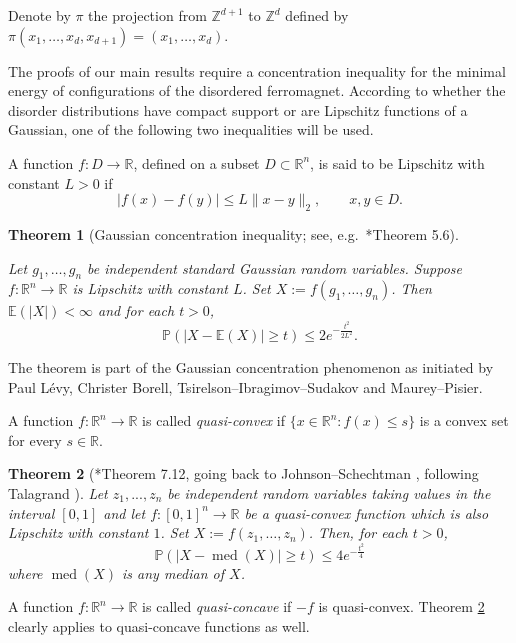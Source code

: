 \documentclass[11pt, reqno]{amsart}
\newtheorem{theorem}{Theorem}[section]
\newcommand{\Z}{\mathbb{Z}}
\newcommand{\R}{\mathbb{R}}
\newcommand{\E}{\mathbb{E}}
\renewcommand{\P}{\mathbb{P}}
\DeclareMathOperator{\med}{med}
\numberwithin{equation}{section}
\begin{document}
Denote by $\pi$ the projection from $\Z^{d+1}$  to $\Z^{d}$ defined by $\pi(x_{1},\dots,x_{d},x_{d+1})=(x_1,\dots,x_d)$.

\medskip
The proofs of our main results require a concentration inequality for the minimal energy of configurations of the disordered ferromagnet. According to whether the disorder distributions have compact support or are Lipschitz functions of a Gaussian, one of the following two inequalities will be used.

A function $f:D\to\R$, defined on a subset $D\subset\R^n$, is said to be Lipschitz with constant $L>0$ if
\begin{equation}\label{eq:Lipschitz function def}
|f(x)-f(y)|\le L\|x-y\|_2,\qquad x,y\in D.
\end{equation}
\begin{theorem}
[Gaussian concentration inequality; see, e.g.~\cite{BLM13}*{Theorem 5.6}]\label{thm:Maurey-Pisier}
\mbox{}

\noindent 
Let $g_1,\ldots, g_n$ be independent standard Gaussian random variables. Suppose $f\colon \R^n\to\R$ is Lipschitz with constant $L$.
Set $X := f(g_1,\ldots, g_n)$. Then $\E(|X|)<\infty$ and for each $t>0$,
\begin{equation*}
\P(|X - \E(X)|\ge t)\le 2e^{-\frac{t^2}{2L^2}}.
\end{equation*}
\end{theorem}
The theorem is part of the Gaussian concentration phenomenon as initiated by Paul L\'{e}vy, Christer Borell, Tsirelson--Ibragimov--Sudakov and Maurey--Pisier.

A function $f:\R^n\to\R$ is called \emph{quasi-convex} if $\{x\in\R^n\colon f(x)\le s\}$ is a convex set for every $s\in\R$.

\begin{theorem}[\cite{BLM13}*{Theorem 7.12}, going back to Johnson--Schechtman \cite{JS91}, following Talagrand \cite{T88}]\label{thm:Lipschitz fcn of bdd} Let $z_1, . . . , z_n$ be independent random variables taking values in the interval $[0, 1]$ and let $f:[0,1]^n\to\R$ be a quasi-convex function which is also Lipschitz with constant $1$.
Set $X:=f(z_1,\ldots, z_n)$. Then, for each $t > 0$,
\begin{equation}\label{eq:med conc Lipschitz fcn of bdd}
\P(|X - \med(X)|\ge t)\le 4e^{-\frac{t^2}{4}}
\end{equation}
where $\med(X)$ is any median of $X$.
\end{theorem}

A function $f:\R^n\to\R$ is called \emph{quasi-concave} if $-f$ is quasi-convex. Theorem \ref{thm:Lipschitz fcn of bdd} clearly applies to quasi-concave functions as well.
\end{document}
